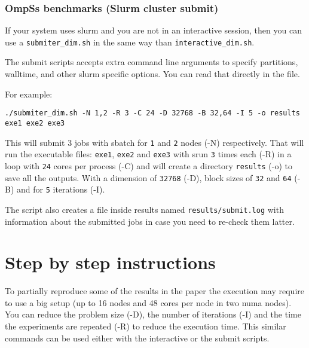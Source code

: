\documentclass{article}
\newcommand{\code}[1]{\texttt{#1}}
\begin{document}
\subsubsection{OmpSs benchmarks (Slurm cluster submit)}

If your system uses slurm and you are not in an interactive session,
then you can use a \code{submiter\_dim.sh} in the same way than
\code{interactive\_dim.sh}. 

The submit scripts accepts extra command line arguments to specify
partitions, walltime, and other slurm specific options. You can read
that directly in the file.

For example:

\begin{lstlisting}
./submiter_dim.sh -N 1,2 -R 3 -C 24 -D 32768 -B 32,64 -I 5 -o results exe1 exe2 exe3
\end{lstlisting}

This will submit 3 jobs with sbatch for \code{1} and \code{2} nodes
(-N) respectively. That will run the executable files: \code{exe1},
\code{exe2} and \code{exe3} with srun \code{3} times each (-R) in a
loop with \code{24} cores per process (-C) and will create a directory
\code{results} (-o) to save all the outputs. With a dimension of
\code{32768} (-D), block sizes of \code{32} and \code{64} (-B) and for
\code{5} iterations (-I).

The script also creates a file inside results named
\code{results/submit.log} with information about the submitted jobs in
case you need to re-check them latter.

\section{Step by step instructions}

To partially reproduce some of the results in the paper the execution
may require to use a big setup (up to 16 nodes and 48 cores per node
in two numa nodes). You can reduce the problem size (-D), the number
of iterations (-I) and the time the experiments are repeated (-R) to
reduce the execution time. This similar commands can be used either
with the interactive or the submit scripts.
\end{document}
